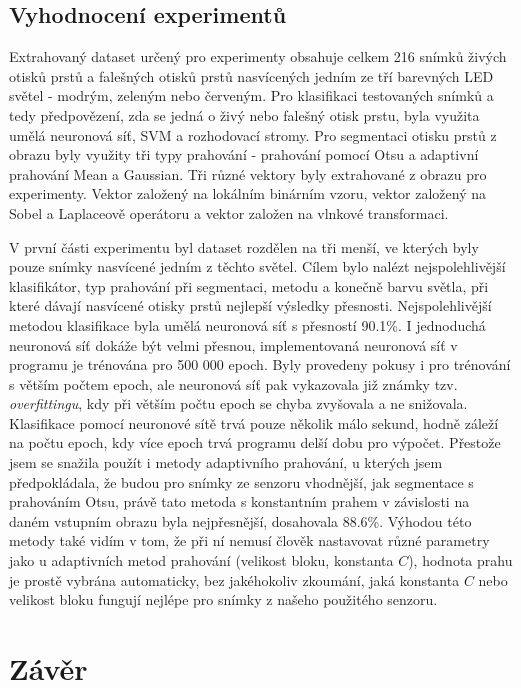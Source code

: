 \section{Vyhodnocení experimentů}
Extrahovaný dataset určený pro experimenty obsahuje celkem 216 snímků živých otisků prstů a falešných otisků prstů nasvícených jedním ze tří barevných LED světel - modrým, zeleným nebo červeným. Pro klasifikaci testovaných snímků a tedy předpovězení, zda se jedná o živý nebo falešný otisk prstu, byla využita umělá neuronová síť, SVM a rozhodovací stromy. Pro segmentaci otisku prstů z obrazu byly využity tři typy prahování - prahování pomocí Otsu a adaptivní prahování Mean a Gaussian. Tři různé vektory byly extrahované z obrazu pro experimenty. Vektor založený na lokálním binárním vzoru, vektor založený na Sobel a Laplaceově operátoru a vektor založen na vlnkové transformaci.

V první části experimentu byl dataset rozdělen na tři menší, ve kterých byly pouze snímky nasvícené jedním z těchto světel. Cílem bylo nalézt nejspolehlivější klasifikátor, typ prahování při segmentaci, metodu a konečně barvu světla, při které dávají nasvícené otisky prstů nejlepší výsledky přesnosti. Nejspolehlivější metodou klasifikace byla umělá neuronová síť s přesností 90.1\%. I jednoduchá neuronová síť dokáže být velmi přesnou, implementovaná neuronová síť v programu je trénována pro 500 000 epoch. Byly provedeny pokusy i pro trénování s větším počtem epoch, ale neuronová síť pak vykazovala již známky tzv. \textit{overfittingu}, kdy při větším počtu epoch se chyba zvyšovala a ne snižovala. Klasifikace pomocí neuronové sítě trvá pouze několik málo sekund, hodně záleží na počtu epoch, kdy více epoch trvá programu delší dobu pro výpočet. Přestože jsem se snažila použít i metody adaptivního prahování, u kterých jsem předpokládala, že budou pro snímky ze senzoru vhodnější, jak segmentace s prahováním Otsu, právě tato metoda s konstantním prahem v závislosti na daném vstupním obrazu byla nejpřesnější, dosahovala 88.6\%. Výhodou této metody také vidím v tom, že při ní nemusí člověk nastavovat různé parametry jako u adaptivních metod prahování (velikost bloku, konstanta $C$), hodnota prahu je prostě vybrána automaticky, bez jakéhokoliv zkoumání, jaká konstanta $C$ nebo velikost bloku fungují nejlépe pro snímky z našeho použitého senzoru.






\label{citace}



\chapter{Závěr}
 

\label{zaver}


